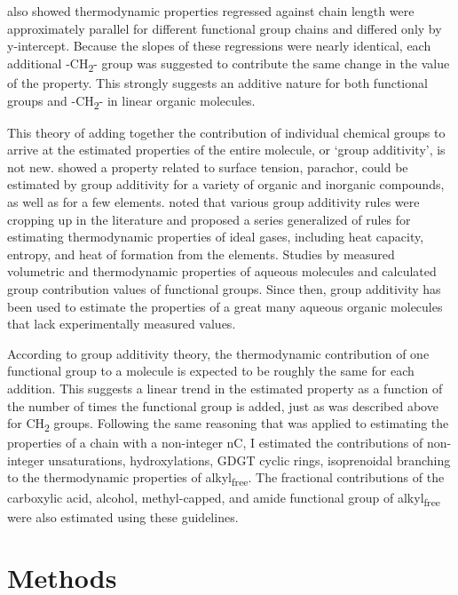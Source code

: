 \cite{shock1990calculation} also showed thermodynamic properties regressed against chain length were approximately parallel for different functional group chains and differed only by y-intercept. Because the slopes of these regressions were nearly identical, each additional -CH\textsubscript{2}- group was suggested to contribute the same change in the value of the property. This strongly suggests an additive nature for both functional groups and -CH\textsubscript{2}- in linear organic molecules.

This theory of adding together the contribution of individual chemical groups to arrive at the estimated properties of the entire molecule, or `group additivity', is not new. \cite{sugden1924cxlii} showed a property related to surface tension, parachor, could be estimated by group additivity for a variety of organic and inorganic compounds, as well as for a few elements. \cite{benson1958additivity} noted that various group additivity rules were cropping up in the literature and proposed a series generalized of rules for estimating thermodynamic properties of ideal gases, including heat capacity, entropy, and heat of formation from the elements. Studies by \cite{cabani1981group, cabani1977volume2, cabani1977volume1} measured volumetric and thermodynamic properties of aqueous molecules and calculated group contribution values of functional groups. Since then, group additivity has been used to estimate the properties of a great many aqueous organic molecules that lack experimentally measured values.

According to group additivity theory, the thermodynamic contribution of one functional group to a molecule is expected to be roughly the same for each addition. This suggests a linear trend in the estimated property as a function of the number of times the functional group is added, just as was described above for CH\textsubscript{2} groups. Following the same reasoning that was applied to estimating the properties of a chain with a non-integer nC, I estimated the contributions of non-integer unsaturations, hydroxylations, GDGT cyclic rings, isoprenoidal branching to the thermodynamic properties of alkyl\textsubscript{free}. The fractional contributions of the carboxylic acid, alcohol, methyl-capped, and amide functional group of alkyl\textsubscript{free} were also estimated using these guidelines.

\section{Methods}
